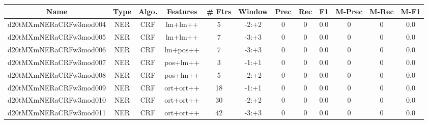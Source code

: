 \documentclass[a4paper]{article}
\begin{document}
\begin{landscape}
\begin{center}
\begin{tabular}{ |c|c|c|c|c|c|c|c|c|c|c|c|}
 \hline
\end{tabular}
\end{center}




\begin{center}
\begin{tabular}{ |c|c|c|c|c|c|c|c|c|c|c|c|} 
 \hline
 	Name & Type & Algo. & Features & \# Ftrs & Window & Prec & Rec & F1 & M-Prec & M-Rec & M-F1\\
 \hline

 	

 
 	
 	\small{ d20tMXmNERaCRFw3mod004 } & \small{ NER} & \small{  CRF }  & lm+lm++  &  5 &  \small{  -2:+2 }  &  0 & 0 & 0.0  &  0 & 0 & 0.0 \\
 	

 
 	
 	\small{ d20tMXmNERaCRFw3mod005 } & \small{ NER} & \small{  CRF }  & lm+lm++  &  7 &  \small{  -3:+3 }  &  0 & 0 & 0.0  &  0 & 0 & 0.0 \\
 	

 
 	
 	\small{ d20tMXmNERaCRFw3mod006 } & \small{ NER} & \small{  CRF }  & lm+pos++  &  7 &  \small{  -3:+3 }  &  0 & 0 & 0.0  &  0 & 0 & 0.0 \\
 	

 
 	
 	\small{ d20tMXmNERaCRFw3mod007 } & \small{ NER} & \small{  CRF }  & pos+lm++  &  3 &  \small{  -1:+1 }  &  0 & 0 & 0.0  &  0 & 0 & 0.0 \\
 	

 
 	
 	\small{ d20tMXmNERaCRFw3mod008 } & \small{ NER} & \small{  CRF }  & pos+lm++  &  5 &  \small{  -2:+2 }  &  0 & 0 & 0.0  &  0 & 0 & 0.0 \\
 	

 
 	
 	\small{ d20tMXmNERaCRFw3mod009 } & \small{ NER} & \small{  CRF }  & ort+ort++  &  18 &  \small{  -1:+1 }  &  0 & 0 & 0.0  &  0 & 0 & 0.0 \\
 	

 
 	
 	\small{ d20tMXmNERaCRFw3mod010 } & \small{ NER} & \small{  CRF }  & ort+ort++  &  30 &  \small{  -2:+2 }  &  0 & 0 & 0.0  &  0 & 0 & 0.0 \\
 	

 
 	
 	\small{ d20tMXmNERaCRFw3mod011 } & \small{ NER} & \small{  CRF }  & ort+ort++  &  42 &  \small{  -3:+3 }  &  0 & 0 & 0.0  &  0 & 0 & 0.0 \\
 	


\end{tabular}
\end{center}
\end{landscape}
\end{document}
